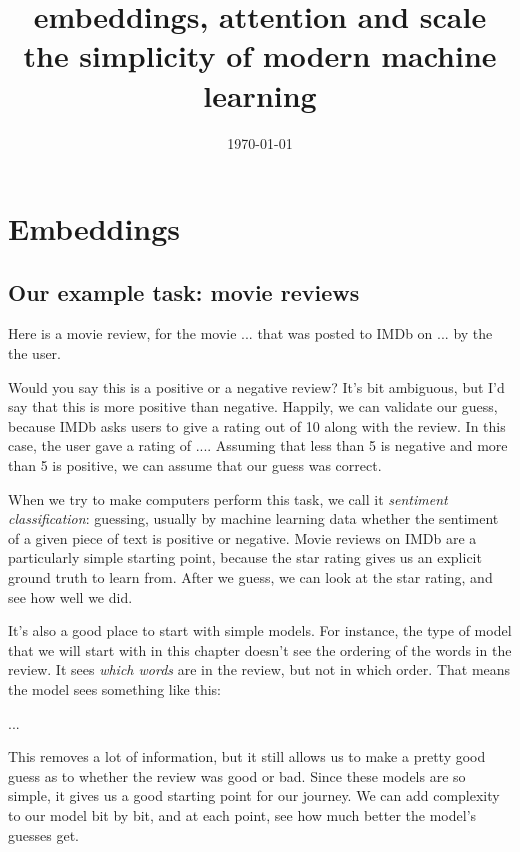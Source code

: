 \documentclass{pca}
\title{embeddings, attention and scale\\ the simplicity of modern machine learning}
\date{\today}
\newcommand{\rc}[1]{{\color{my-red} #1}}
\newcommand{\bc}[1]{{\color{my-blue} #1}}
\theoremstyle{theorem}
\theoremstyle{definition}
\theoremstyle{proof}
\begin{document}
\maketitle

\tableofcontents


\chapter{Embeddings}


\section{Our example task: movie reviews}

Here is a movie review, for the movie ... that was posted to IMDb on ... by the the user.


\blockquote{}

Would you say this is a \bc{positive} or a \rc{negative} review? It's bit ambiguous, but I'd say that this is more positive than negative. Happily, we can validate our guess, because IMDb asks users to give a rating out of 10 along with the review. In this case, the user gave a rating of .... Assuming that less than 5 is negative and more than 5 is positive, we can assume that our guess was correct.

When we try to make computers perform this task, we call it \emph{sentiment classification}: guessing, usually by machine learning data whether the sentiment of a given piece of text is positive or negative. Movie reviews on IMDb are a particularly simple starting point, because the star rating gives us an explicit ground truth to learn from. After we guess, we can look at the star rating, and see how well we did. 

It's also a good place to start with simple models. For instance, the type of model that we will start with in this chapter doesn't see the ordering of the words in the review. It sees \emph{which words} are in the review, but not in which order. That means the model sees something like this:

...

This removes a lot of information, but it still allows us to make a pretty good guess as to whether the review was good or bad. Since these models are so simple, it gives us a good starting point for our journey. We can add complexity to our model bit by bit, and at each point, see how much better the model's guesses get.
\end{document}
